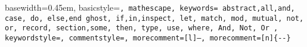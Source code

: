 { basewidth=0.45em,
  basicstyle=\scriptsize\tt,  %
  mathescape,
  keywords={
    abstract,all,and,
    case,
    do,
    else,end
    ghost,
    if,in,inspect,
    let,
    match, mod, mutual,
    not,
    or,
    record,
    section,some,
    then,
    type,
    use,
    where,
    And,
    Not,
    Or
  },
  keywordstyle=\color{blue},
  commentstyle=\color{brown},
  morecomment=[l]{--},
  morecomment=[n]{\{-}{-\}}
}

 {\lstset{language=alba}} {}
